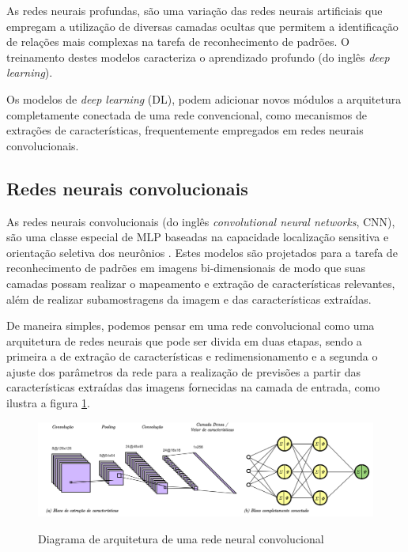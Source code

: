 As redes neurais profundas, são uma variação das redes neurais artificiais que empregam a utilização de diversas camadas ocultas que permitem a identificação de relações mais complexas na tarefa de reconhecimento de padrões. O treinamento destes modelos caracteriza o aprendizado profundo (do inglês \textit{deep learning}).

Os modelos de \textit{deep learning} (DL), podem adicionar novos módulos a arquitetura completamente conectada de uma rede convencional, como mecanismos de extrações de características, frequentemente empregados em redes neurais convolucionais.

\subsection{Redes neurais convolucionais}

As redes neurais convolucionais (do inglês \textit{convolutional neural networks}, CNN), são uma classe especial de MLP baseadas na capacidade localização sensitiva e orientação seletiva dos neurônios \cite{haykinNeuralNetworksLearning2009}.
Estes modelos são projetados para a tarefa de reconhecimento de padrões em imagens bi-dimensionais de modo que suas camadas possam realizar o mapeamento e extração de características relevantes, além de realizar subamostragens da imagem e das características extraídas.

De maneira simples, podemos pensar em uma rede convolucional como uma arquitetura de redes neurais que pode ser divida em duas etapas, sendo a primeira a de extração de características e redimensionamento e a segunda o ajuste dos parâmetros da rede para a realização de previsões a partir das características extraídas das imagens fornecidas na camada de entrada, como ilustra a figura \ref{fig:cnn}.

\begin{figure}[htbp]
	\centering
	\caption{Diagrama de arquitetura de uma rede neural convolucional}
		\includegraphics[scale=.23]{imagens/cnn.png}
	\label{fig:cnn}
\end{figure}


